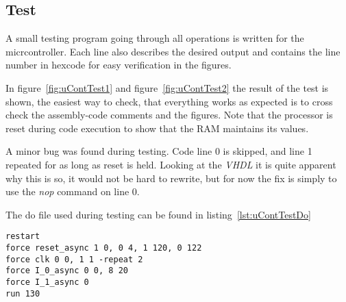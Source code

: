 \subsection{Test}
A small testing program going through all operations is written for the
micrcontroller. Each line also describes the desired output and contains the
line number in hexcode for easy verification in the figures.




In figure~\ref{fig:uContTest1} and figure~\ref{fig:uContTest2} the result of the
test is shown, the easiest way to check, that everything works as expected is to
cross check the assembly-code comments and the figures. Note that the processor
is reset during code execution to show that the RAM maintains its values.


A minor bug was found during testing. Code line 0 is skipped, and line 1
repeated for as long as reset is held. Looking at the \emph{VHDL} it is quite
apparent why this is so, it would not be hard to rewrite, but for now the fix is
simply to use the \emph{nop} command on line 0.

The do file used during testing can be found in listing~\ref{lst:uContTestDo}

\begin{lstlisting}[caption={Do file for the test of the microcontroller},
label={lst:uContTestDo}]
restart
force reset_async 1 0, 0 4, 1 120, 0 122
force clk 0 0, 1 1 -repeat 2
force I_0_async 0 0, 8 20
force I_1_async 0
run 130
\end{lstlisting}

